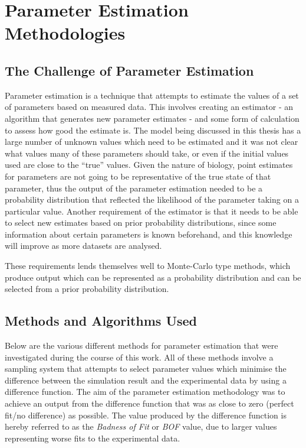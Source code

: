 \chapter{Parameter Estimation Methodologies}
\label{chap:paramest}

\section{The Challenge of Parameter Estimation}

Parameter estimation is a technique that attempts to estimate the values of a set of parameters based on measured data. This involves creating an estimator - an algorithm that generates new parameter estimates - and some form of calculation to assess how good the estimate is. The model being discussed in this thesis has a large number of unknown values which need to be estimated and it was not clear what values many of these parameters should take, or even if the initial values used are close to the ``true'' values. Given the nature of biology, point estimates for parameters are not going to be representative of the true state of that parameter, thus the output of the parameter estimation needed to be a probability distribution that reflected the likelihood of the parameter taking on a particular value. Another requirement of the estimator is that it needs to be able to select new estimates based on prior probability distributions, since some information about certain parameters is known beforehand, and this knowledge will improve as more datasets are analysed.

These requirements lends themselves well to Monte-Carlo type methods, which produce output which can be represented as a probability distribution and can be selected from a prior probability distribution.

\section{Methods and Algorithms Used}

Below are the various different methods for parameter estimation that were investigated during the course of this work. All of these methods involve a sampling system that attempts to select parameter values which minimise the difference between the simulation result and the experimental data by using a difference function. The aim of the parameter estimation methodology was to achieve an output from the difference function that was as close to zero (perfect fit/no difference) as possible. The value produced by the difference function is hereby referred to as the \textit{Badness of Fit} or \textit{BOF} value, due to larger values representing worse fits to the experimental data.

